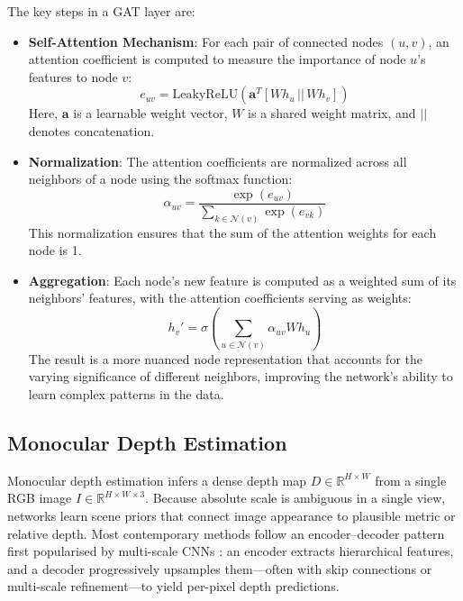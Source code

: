 The key steps in a GAT layer are:
\begin{itemize}
  \item \textbf{Self-Attention Mechanism}: For each pair of connected nodes \(
  (u, v) \), an attention coefficient is computed to measure the importance of
  node \( u \)’s features to node \( v \):
  \begin{equation}
    e_{uv} = \mathrm{LeakyReLU} \left( \mathbf{a}^T \left[ W h_u \, || \, W h_v \right] \right)
  \end{equation}
  Here, \( \mathbf{a} \) is a learnable weight vector, \( W \) is a shared
  weight matrix, and \( || \) denotes concatenation.
  \item \textbf{Normalization}: The attention coefficients are normalized across
  all neighbors of a node using the softmax function:
  \begin{equation}
    \alpha_{uv} = \frac{\exp(e_{uv})}{\sum_{k \in \mathcal{N}(v)} \exp(e_{vk})}
  \end{equation}
  This normalization ensures that the sum of the attention weights for each node
  is 1.
  \item \textbf{Aggregation}: Each node’s new feature is computed as a weighted
  sum of its neighbors’ features, with the attention coefficients serving as
  weights:
  \begin{equation}
    h_v' = \sigma \left( \sum_{u \in \mathcal{N}(v)} \alpha_{uv} W h_u \right)
  \end{equation}
  The result is a more nuanced node representation that accounts for the varying
  significance of different neighbors, improving the network's ability to learn
  complex patterns in the data.
\end{itemize}

\subsection{Monocular Depth Estimation} 

Monocular depth estimation infers a dense depth map $D \in \mathbb{R}^{H \times
W}$ from a single RGB image $I \in \mathbb{R}^{H \times W \times 3}$. Because
absolute scale is ambiguous in a single view, networks learn scene priors that
connect image appearance to plausible metric or relative depth. Most
contemporary methods follow an encoder–decoder pattern first popularised by
multi-scale CNNs \cite{eigen2014depth,laina2016deeper}: an encoder extracts
hierarchical features, and a decoder progressively upsamples them—often with
skip connections or multi-scale refinement—to yield per-pixel depth
predictions.

